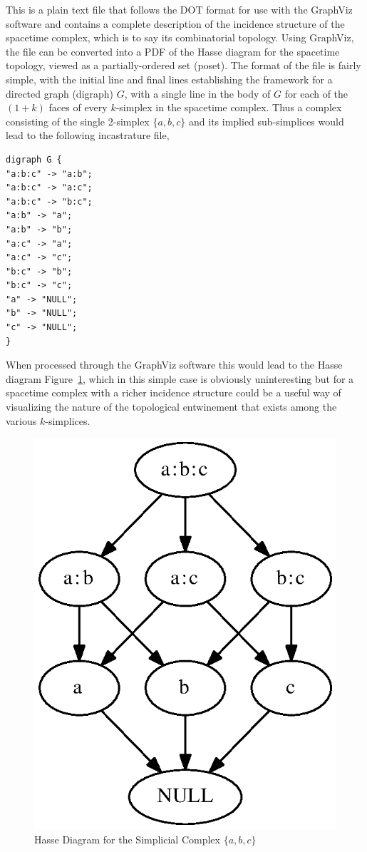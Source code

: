 \documentclass[12pt,letterpaper]{report}
\begin{document}
This is a plain text file that follows the DOT format for use with the GraphViz software and contains 
a complete description of the incidence structure of the spacetime complex, which is to say its 
combinatorial topology. Using GraphViz, the file can be converted into a PDF of the Hasse diagram 
for the spacetime topology, viewed as a partially-ordered set (poset). The format of the file is 
fairly simple, with the initial line and final lines establishing the framework for a directed graph 
(digraph) $G$, with a single line in the body of $G$ for each of the $(1+k)$ faces of every $k$-simplex 
in the spacetime complex. Thus a complex consisting of the single 2-simplex $\{a,b,c\}$ and its implied 
sub-simplices would lead to the following incastrature file,
\begin{verbatim}
digraph G {
"a:b:c" -> "a:b";
"a:b:c" -> "a:c";
"a:b:c" -> "b:c";
"a:b" -> "a";
"a:b" -> "b";
"a:c" -> "a";
"a:c" -> "c";
"b:c" -> "b";
"b:c" -> "c";
"a" -> "NULL";
"b" -> "NULL";
"c" -> "NULL";
}
\end{verbatim} 
When processed through the GraphViz software this would lead to the Hasse diagram Figure~\ref{hasse}, 
which in this simple case is obviously uninteresting but for a spacetime complex with a richer incidence 
structure could be a useful way of visualizing the nature of the topological entwinement that exists 
among the various $k$-simplices. 
\begin{figure}[htp]
\centering
\includegraphics[width=5in]{images/scomplex.eps}
\caption{Hasse Diagram for the Simplicial Complex $\{a,b,c\}$}
\label{hasse} 
\end{figure}
\end{document}
